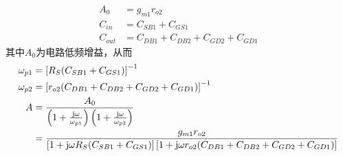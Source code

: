 \documentclass[hyperref, UTF8]{ctexart}
\newcommand{\J}{{\rm j}}
\begin{document}
    \begin{align*}
        A_0 & = g_{m1}r_{o2} \\
        C_{in} & = C_{SB1}+C_{GS1} \\
        C_{out} & = C_{DB1}+C_{DB2}+C_{GD2}+C_{GD1}
    \end{align*}
    其中$A_0$为电路低频增益，从而
    \begin{align*}
        \omega_{p1} & = \left[ R_S 
            (C_{SB1}+C_{GS1})
            \right] ^ {-1} \\
        \omega_{p2} & = \left[ r_{o2}
            (C_{DB1}+C_{DB2}+C_{GD2}+C_{GD1})
            \right] ^ {-1}\\
        A & = \frac{A_0}{
            \left( 1 + \frac{\J \omega}{\omega_{p1}}
            \right)
            \left( 1 + \frac{\J \omega}{\omega_{p2}} \right)
        } \\
        & = \frac{g_{m1}r_{o2}}{
            \left[ 1 + \J \omega R_S 
            (C_{SB1}+C_{GS1}) \right]
            \left[ 1 + \J \omega r_{o2}
            (C_{DB1}+C_{DB2}+C_{GD2}+C_{GD1}) \right]
        }
    \end{align*}
\end{document}
